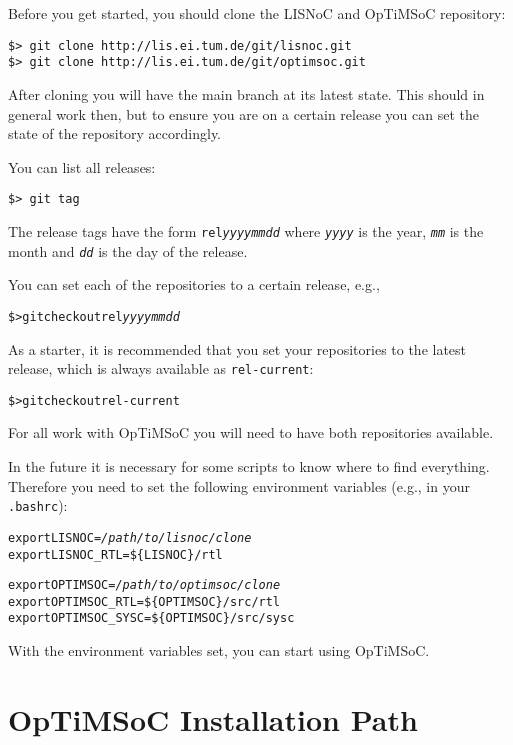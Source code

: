 Before you get started, you should clone the LISNoC and OpTiMSoC
repository:

\begin{verbatim}
$> git clone http://lis.ei.tum.de/git/lisnoc.git
$> git clone http://lis.ei.tum.de/git/optimsoc.git
\end{verbatim}

After cloning you will have the main branch at its latest state. This
should in general work then, but to ensure you are on a certain
release you can set the state of the repository accordingly.

You can list all releases:

\begin{verbatim}
$> git tag
\end{verbatim}

The release tags have the form \texttt{rel\emph{yyyymmdd}} where
\texttt{\emph{yyyy}} is the year, \texttt{\emph{mm}} is the month and
\texttt{\emph{dd}} is the day of the release.

You can set each of the repositories to a certain release, e.g.,

\begin{alltt}
\$> git checkout rel\emph{yyyymmdd}
\end{alltt}

As a starter, it is recommended that you set your repositories to the
latest release, which is always available as \texttt{rel-current}:

\begin{alltt}
\$> git checkout rel-current
\end{alltt}

For all work with OpTiMSoC you will need to have both repositories
available.

In the future it is necessary for some scripts to know where to find
everything. Therefore you need to set the following environment
variables (e.g., in your \verb|.bashrc|):

\begin{alltt}
export LISNOC=\emph{/path/to/lisnoc/clone}
export LISNOC_RTL=\$\{LISNOC\}/rtl

export OPTIMSOC=\emph{/path/to/optimsoc/clone}
export OPTIMSOC_RTL=\$\{OPTIMSOC\}/src/rtl
export OPTIMSOC_SYSC=\$\{OPTIMSOC\}/src/sysc
\end{alltt}

With the environment variables set, you can start using OpTiMSoC.

\section{OpTiMSoC Installation Path}

